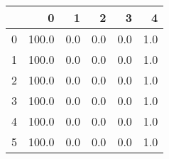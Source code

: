 \begin{tabular}{lrrrrr}
\toprule
{} &      0 &    1 &    2 &    3 &    4 \\
\midrule
0 &  100.0 &  0.0 &  0.0 &  0.0 &  1.0 \\
1 &  100.0 &  0.0 &  0.0 &  0.0 &  1.0 \\
2 &  100.0 &  0.0 &  0.0 &  0.0 &  1.0 \\
3 &  100.0 &  0.0 &  0.0 &  0.0 &  1.0 \\
4 &  100.0 &  0.0 &  0.0 &  0.0 &  1.0 \\
5 &  100.0 &  0.0 &  0.0 &  0.0 &  1.0 \\
\bottomrule
\end{tabular}
